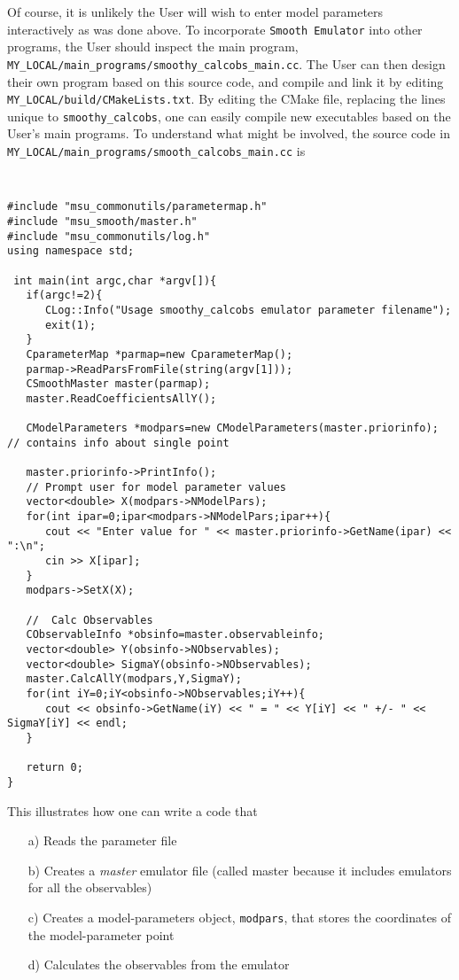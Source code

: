 \documentclass[UserManual.tex]{subfiles}
\begin{document}
Of course, it is unlikely the User will wish to enter model parameters interactively as was done above. To incorporate {\tt Smooth Emulator} into other programs, the User should inspect the main program, {\tt MY\_LOCAL/main\_programs/smoothy\_calcobs\_main.cc}. The User can then design their own program based on this source code, and compile and link it by editing {\tt MY\_LOCAL/build/CMakeLists.txt}. By editing the CMake file, replacing the lines unique to {\tt smoothy\_calcobs}, one can easily compile new executables based on the User's main programs. To understand what might be involved, the source code in {\tt MY\_LOCAL/main\_programs/smooth\_calcobs\_main.cc} is
{\tt
\begin{verbatim}
#include "msu_commonutils/parametermap.h"
#include "msu_smooth/master.h"
#include "msu_commonutils/log.h"
using namespace std;

 int main(int argc,char *argv[]){
   if(argc!=2){
      CLog::Info("Usage smoothy_calcobs emulator parameter filename");
      exit(1);
   }
   CparameterMap *parmap=new CparameterMap();
   parmap->ReadParsFromFile(string(argv[1]));
   CSmoothMaster master(parmap);
   master.ReadCoefficientsAllY();
   
   CModelParameters *modpars=new CModelParameters(master.priorinfo); // contains info about single point
   
   master.priorinfo->PrintInfo();
   // Prompt user for model parameter values
   vector<double> X(modpars->NModelPars);
   for(int ipar=0;ipar<modpars->NModelPars;ipar++){
      cout << "Enter value for " << master.priorinfo->GetName(ipar) << ":\n";
      cin >> X[ipar];
   }
   modpars->SetX(X);
   
   //  Calc Observables
   CObservableInfo *obsinfo=master.observableinfo;
   vector<double> Y(obsinfo->NObservables);
   vector<double> SigmaY(obsinfo->NObservables);
   master.CalcAllY(modpars,Y,SigmaY);
   for(int iY=0;iY<obsinfo->NObservables;iY++){
      cout << obsinfo->GetName(iY) << " = " << Y[iY] << " +/- " << SigmaY[iY] << endl;
   }

   return 0;
}
\end{verbatim}
}
This illustrates how one can write a code that 
\begin{itemize}\itemsep=0pt
\item[a)] Reads the parameter file
\item[b)] Creates a {\it master} emulator file (called master because it includes emulators for all the observables)
\item[c)] Creates a model-parameters object, {\tt modpars}, that stores the coordinates of the model-parameter point
\item[d)] Calculates the observables from the emulator
\end{itemize}
\end{document}
